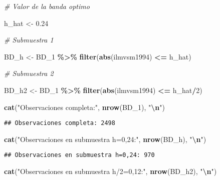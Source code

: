 \documentclass[
]{article}
\newenvironment{Shaded}{\begin{snugshade}}{\end{snugshade}}
\newcommand{\CommentTok}[1]{\textcolor[rgb]{0.56,0.35,0.01}{\textit{#1}}}
\newcommand{\DecValTok}[1]{\textcolor[rgb]{0.00,0.00,0.81}{#1}}
\newcommand{\FloatTok}[1]{\textcolor[rgb]{0.00,0.00,0.81}{#1}}
\newcommand{\FunctionTok}[1]{\textcolor[rgb]{0.13,0.29,0.53}{\textbf{#1}}}
\newcommand{\NormalTok}[1]{#1}
\newcommand{\OtherTok}[1]{\textcolor[rgb]{0.56,0.35,0.01}{#1}}
\newcommand{\SpecialCharTok}[1]{\textcolor[rgb]{0.81,0.36,0.00}{\textbf{#1}}}
\newcommand{\StringTok}[1]{\textcolor[rgb]{0.31,0.60,0.02}{#1}}
\begin{document}
\begin{Shaded}
\begin{Highlighting}[]
\CommentTok{\# Valor de la banda optimo}

\NormalTok{h\_hat }\OtherTok{\textless{}{-}} \FloatTok{0.24}

\CommentTok{\# Submuestra 1}

\NormalTok{BD\_h }\OtherTok{\textless{}{-}}\NormalTok{ BD\_1 }\SpecialCharTok{\%\textgreater{}\%}
  \FunctionTok{filter}\NormalTok{(}\FunctionTok{abs}\NormalTok{(ilmvsm1994) }\SpecialCharTok{\textless{}=}\NormalTok{ h\_hat)}

\CommentTok{\# Submuestra 2}

\NormalTok{BD\_h2 }\OtherTok{\textless{}{-}}\NormalTok{ BD\_1 }\SpecialCharTok{\%\textgreater{}\%}
  \FunctionTok{filter}\NormalTok{(}\FunctionTok{abs}\NormalTok{(ilmvsm1994) }\SpecialCharTok{\textless{}=}\NormalTok{ h\_hat}\SpecialCharTok{/}\DecValTok{2}\NormalTok{)}

\FunctionTok{cat}\NormalTok{(}\StringTok{"Observaciones completa:"}\NormalTok{, }\FunctionTok{nrow}\NormalTok{(BD\_1), }\StringTok{"}\SpecialCharTok{\textbackslash{}n}\StringTok{"}\NormalTok{)}
\end{Highlighting}
\end{Shaded}

\begin{verbatim}
## Observaciones completa: 2498
\end{verbatim}

\begin{Shaded}
\begin{Highlighting}[]
\FunctionTok{cat}\NormalTok{(}\StringTok{"Observaciones en submuestra h=0,24:"}\NormalTok{, }\FunctionTok{nrow}\NormalTok{(BD\_h), }\StringTok{"}\SpecialCharTok{\textbackslash{}n}\StringTok{"}\NormalTok{)}
\end{Highlighting}
\end{Shaded}

\begin{verbatim}
## Observaciones en submuestra h=0,24: 970
\end{verbatim}

\begin{Shaded}
\begin{Highlighting}[]
\FunctionTok{cat}\NormalTok{(}\StringTok{"Observaciones en submuestra h/2=0,12:"}\NormalTok{, }\FunctionTok{nrow}\NormalTok{(BD\_h2), }\StringTok{"}\SpecialCharTok{\textbackslash{}n}\StringTok{"}\NormalTok{)}
\end{Highlighting}
\end{Shaded}
\end{document}
